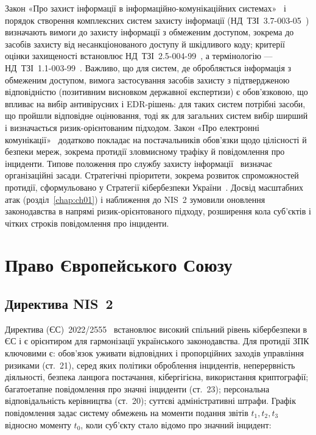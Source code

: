 Закон «Про захист інформації в інформаційно-комунікаційних системах»~\cite{zu-zi} і порядок створення комплексних систем захисту інформації (НД~ТЗІ~3.7-003-05~\cite{ndtzi-3-7-003}) визначають вимоги до захисту інформації з обмеженим доступом, зокрема до засобів захисту від несанкціонованого доступу й шкідливого коду; критерії оцінки захищеності встановлює НД~ТЗІ~2.5-004-99~\cite{ndtzi-2-5-004}, а термінологію --- НД~ТЗІ~1.1-003-99~\cite{ndtzi-1-1-003}. Важливо, що для систем, де обробляється інформація з обмеженим доступом, вимога застосування засобів захисту з підтвердженою відповідністю (позитивним висновком державної експертизи) є обов'язковою, що впливає на вибір антивірусних і EDR-рішень: для таких систем потрібні засоби, що пройшли відповідне оцінювання, тоді як для загальних систем вибір ширший і визначається ризик-орієнтованим підходом. Закон «Про електронні комунікації»~\cite{ch02:zu-ek} додатково покладає на постачальників обов'язки щодо цілісності й безпеки мереж, зокрема протидії зловмисному трафіку й повідомлення про інциденти. Типове положення про службу захисту інформації~\cite{ch02:ndtzi-1-4} визначає організаційні засади. Стратегічні пріоритети, зокрема розвиток спроможностей протидії, сформульовано у Стратегії кібербезпеки України~\cite{ukaz-447}. Досвід масштабних атак (розділ~\ref{chap:ch01}) і наближення до NIS~2 зумовили оновлення законодавства в напрямі ризик-орієнтованого підходу, розширення кола суб'єктів і чітких строків повідомлення про інциденти.

\section{Право Європейського Союзу}\label{sec:ch02-eu}

\subsection{Директива NIS~2}

Директива (ЄС)~2022/2555~\cite{nis2} встановлює високий спільний рівень кібербезпеки в ЄС і є орієнтиром для гармонізації українського законодавства. Для протидії ЗПК ключовими є: обов'язок уживати відповідних і пропорційних заходів управління ризиками (ст.~21), серед яких політики оброблення інцидентів, неперервність діяльності, безпека ланцюга постачання, кібергігієна, використання криптографії; багатоетапне повідомлення про значні інциденти (ст.~23); персональна відповідальність керівництва (ст.~20); суттєві адміністративні штрафи. Графік повідомлення задає систему обмежень на моменти подання звітів $t_1,t_2,t_3$ відносно моменту $t_0$, коли суб'єкту стало відомо про значний інцидент:

